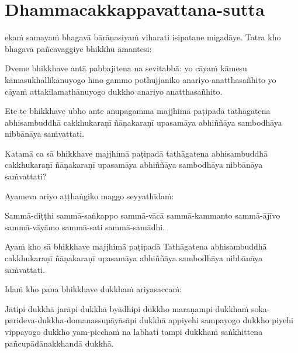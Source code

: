 \section{Dhammacakkappavattana-sutta}

\begin{pali-hang}
 ekaṁ samayaṁ bhagavā bārāṇasiyaṁ viharati isipatane migadāye. Tatra kho bhagavā pañcavaggiye bhikkhū āmantesi:
\end{pali-hang}

\begin{pali-hang}
Dveme bhikkhave antā pabbajitena na sevitabbā: yo cāyaṁ kāmesu kāmasukhallikānuyogo hīno gammo pothujjaniko anariyo anatthasañhito yo cāyaṁ attakilamathānuyogo dukkho anariyo anatthasañhito.
\end{pali-hang}

\begin{pali-hang}
Ete te bhikkhave ubho ante anupagamma majjhimā paṭipadā tathāgatena abhisambuddhā cakkhukaraṇī ñāṇakaraṇī upasamāya abhiññāya sambodhāya nibbānāya saṁvattati.
\end{pali-hang}

\begin{pali-hang}
Katamā ca sā bhikkhave majjhimā paṭipadā tathāgatena abhisambuddhā cakkhukaraṇī ñāṇakaraṇī upasamāya abhiññāya sambodhāya nibbānāya saṁvattati?
\end{pali-hang}

\begin{pali-hang}
Ayameva ariyo aṭṭhaṅgiko maggo seyyathīdaṁ:
\end{pali-hang}

\begin{pali-hang}
Sammā-diṭṭhi sammā-saṅkappo sammā-vācā sammā-kammanto sammā-ājīvo sammā-vāyāmo sammā-sati sammā-samādhi.
\end{pali-hang}

\begin{pali-hang}
Ayaṁ kho sā bhikkhave majjhimā paṭipadā Tathāgatena abhisambuddhā cakkhukaraṇī ñāṇakaraṇī upasamāya abhiññāya sambodhāya nibbānāya saṁvattati.
\end{pali-hang}

\begin{pali-hang}
Idaṁ kho pana bhikkhave dukkhaṁ ariyasaccaṁ:
\end{pali-hang}

\begin{pali-hang}
Jātipi dukkhā jarāpi dukkhā byādhipi dukkho maraṇampi dukkhaṁ soka-parideva-dukkha-domanassupāyāsāpi dukkhā appiyehi sampayogo dukkho piyehi vippayogo dukkho yam-picchaṁ na labhati tampi dukkhaṁ saṅkhittena pañcupādānakkhandā dukkhā.
\end{pali-hang}


